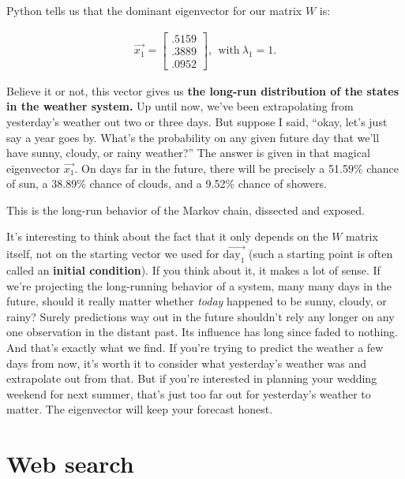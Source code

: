 \begin{alttitles}
Python tells us that the dominant eigenvector for our matrix $W$ is:

\vspace{-.15in}
\begin{align*}
\overrightarrow{x_1} = \begin{bmatrix} .5159 \\ .3889 \\ .0952 \end{bmatrix},
\ \ \textrm{with} \ \lambda_1 = 1.
\end{align*}
\vspace{-.15in}

Believe it or not, this vector gives us \textbf{the long-run distribution of
the states in the weather system.} Up until now, we've been extrapolating from
yesterday's weather out two or three days. But suppose I said, ``okay, let's
just say a year goes by. What's the probability on any given future day that
we'll have sunny, cloudy, or rainy weather?'' The answer is given in that
magical eigenvector $\overrightarrow{x_1}$. On days far in the future, there
will be precisely a 51.59\% chance of sun, a 38.89\% chance of clouds, and a
9.52\% chance of showers.


This is the long-run behavior of the Markov chain, dissected and exposed.

It's interesting to think about the fact that it only depends on the $W$ matrix
itself, not on the starting vector we used for
$\overrightarrow{\textrm{day}_1}$ (such a starting point is often called an
\textbf{initial condition}). If you think about it, it makes a lot of sense. If
we're projecting the long-running behavior of a system, many many days in the
future, should it really matter whether \textit{today} happened to be sunny,
cloudy, or rainy? Surely predictions way out in the future shouldn't rely any
longer on any one observation in the distant past. Its influence has long since
faded to nothing. And that's exactly what we find. If you're trying to predict
the weather a few days from now, it's worth it to consider what yesterday's
weather was and extrapolate out from that. But if you're interested in planning
your wedding weekend for next summer, that's just too far out for yesterday's
weather to matter. The eigenvector will keep your forecast honest.

\vfill
\pagebreak

\renewcommand{\thesubsection}{W\arabic{subsection}.}%
\section{Web search}


\end{alttitles}
